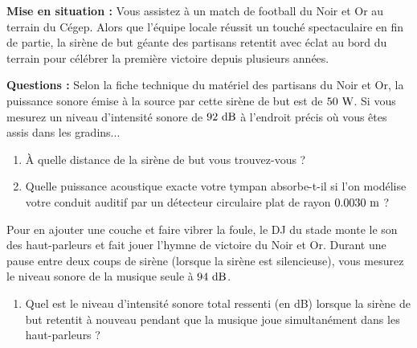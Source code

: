\textbf{Mise en situation :} Vous assistez à un match de football du Noir et Or au terrain du Cégep. Alors que l'équipe locale réussit un touché spectaculaire en fin de partie, la sirène de but géante des partisans retentit avec éclat au bord du terrain pour célébrer la première victoire depuis plusieurs années.

\textbf{Questions :} Selon la fiche technique du matériel des partisans du Noir et Or, la puissance sonore émise à la source par cette sirène de but est de $50\text{ W}$. Si vous mesurez un niveau d'intensité sonore de $92\text{ dB}$ à l'endroit précis où vous êtes assis dans les gradins...

\begin{enumerate}[label=\alph*)]
    \item À quelle distance de la sirène de but vous trouvez-vous ?
    \item Quelle puissance acoustique exacte votre tympan absorbe-t-il si l'on modélise votre conduit auditif par un détecteur circulaire plat de rayon $0.0030\text{ m}$ ?
\end{enumerate}

Pour en ajouter une couche et faire vibrer la foule, le DJ du stade monte le son des haut-parleurs et fait jouer l'hymne de victoire du Noir et Or. Durant une pause entre deux coups de sirène (lorsque la sirène est silencieuse), vous mesurez le niveau sonore de la musique seule à $94\text{ dB}$.

\begin{enumerate}[label= c)]
    \item Quel est le niveau d'intensité sonore total ressenti (en dB) lorsque la sirène de but retentit à nouveau pendant que la musique joue simultanément dans les haut-parleurs ?
\end{enumerate}
